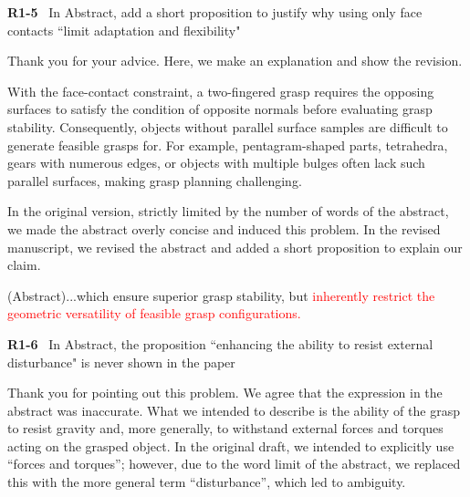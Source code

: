 \documentclass[journal]{IEEEtran}
\newcommand{\rev}[1]{\textcolor{red}{#1}}
\begin{document}


\bigskip

\noindent
{\textbf{\color{black}R1-5}\color{gray}~
In Abstract, add a short proposition to justify why using only face contacts ``limit adaptation and flexibility"
}

Thank you for your advice. Here, we make an explanation and show the revision.

With the face-contact constraint, a two-fingered grasp requires the opposing surfaces to satisfy the condition of opposite normals before evaluating grasp stability. Consequently, objects without parallel surface samples are difficult to generate feasible grasps for. For example, pentagram-shaped parts, tetrahedra, gears with numerous edges, or objects with multiple bulges often lack such parallel surfaces, making grasp planning challenging.

In the original version, strictly limited by the number of words of the abstract, we made the abstract overly concise and induced this problem. In the revised manuscript, we revised the abstract and added a short proposition to explain our claim. 

(Abstract)...which ensure superior grasp stability, but \rev{inherently restrict the geometric versatility of feasible grasp configurations.}\\

\bigskip

\noindent
{\textbf{\color{black}R1-6}\color{gray}~
In Abstract, the proposition ``enhancing the ability to resist external disturbance" is never shown in the paper
}

Thank you for pointing out this problem. We agree that the expression in the abstract was inaccurate. What we intended to describe is the ability of the grasp to resist gravity and, more generally, to withstand external forces and torques acting on the grasped object. In the original draft, we intended to explicitly use ``forces and torques”; however, due to the word limit of the abstract, we replaced this with the more general term ``disturbance”, which led to ambiguity.
\end{document}

